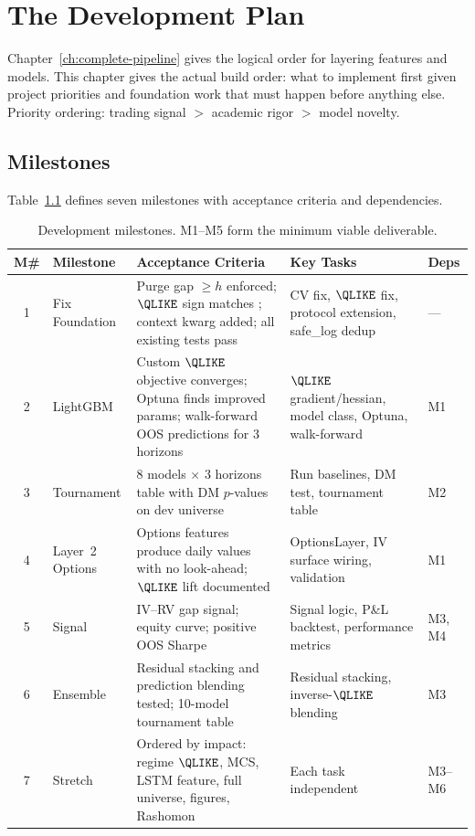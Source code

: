 \chapter{The Development Plan}
\label{ch:development-plan}

Chapter~\ref{ch:complete-pipeline} gives the logical order for layering features and models.
This chapter gives the actual build order: what to implement first given project priorities and foundation work that must happen before anything else.
Priority ordering: trading signal $>$ academic rigor $>$ model novelty.


\section{Milestones}
\label{sec:milestones}

Table~\ref{tab:milestones} defines seven milestones with acceptance criteria and dependencies.

\begin{table}[htbp]
\centering
\caption{Development milestones. M1--M5 form the minimum viable deliverable.}
\label{tab:milestones}
\small
\begin{tabular}{@{}clp{4.8cm}p{4.2cm}l@{}}
\toprule
\textbf{M\#} & \textbf{Milestone} & \textbf{Acceptance Criteria} & \textbf{Key Tasks} & \textbf{Deps} \\
\midrule
1 & Fix Foundation &
  Purge gap $\geq h$ enforced; $\QLIKE$ sign matches \citet{Patton2011}; context kwarg added; all existing tests pass &
  CV fix, $\QLIKE$ fix, protocol extension, safe\_log dedup &
  --- \\[8pt]
2 & LightGBM &
  Custom $\QLIKE$ objective converges; Optuna finds improved params; walk-forward OOS predictions for 3 horizons &
  $\QLIKE$ gradient/hessian, model class, Optuna, walk-forward &
  M1 \\[8pt]
3 & Tournament &
  8 models $\times$ 3 horizons table with DM $p$-values on dev universe &
  Run baselines, DM test, tournament table &
  M2 \\[8pt]
4 & Layer~2 Options &
  Options features produce daily values with no look-ahead; $\QLIKE$ lift documented &
  OptionsLayer, IV surface wiring, validation &
  M1 \\[8pt]
5 & Signal &
  IV--RV gap signal; equity curve; positive OOS Sharpe &
  Signal logic, P\&L backtest, performance metrics &
  M3, M4 \\[8pt]
6 & Ensemble &
  Residual stacking and prediction blending tested; 10-model tournament table &
  Residual stacking, inverse-$\QLIKE$ blending &
  M3 \\[8pt]
7 & Stretch &
  Ordered by impact: regime $\QLIKE$, MCS, LSTM feature, full universe, figures, Rashomon &
  Each task independent &
  M3--M6 \\
\bottomrule
\end{tabular}
\end{table}


